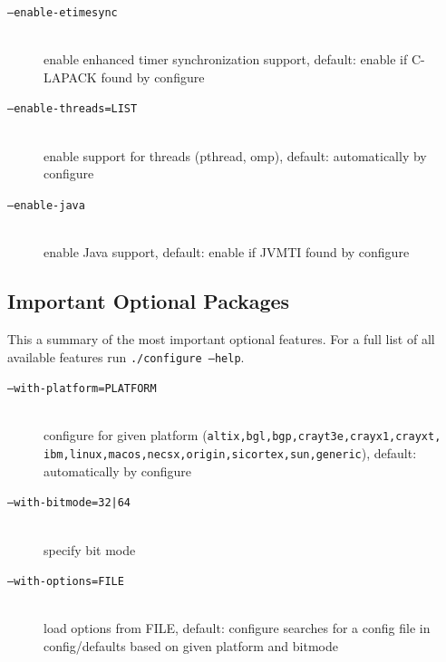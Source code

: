 \documentclass[a4paper,twoside,12pt,BCOR12mm]{scrbook}
\begin{document}
\begin{latexonly}
\begin{description}
\item[\texttt{--enable-etimesync}] ~\\
                              enable enhanced timer synchronization support,
                              default: enable if \latex{\\} C-LAPACK found by configure

\item[\texttt{--enable-threads=LIST}] ~\\
                              enable support for threads (pthread, omp), 
                              default: automatically by configure

\item[\texttt{--enable-java}] ~\\
                              enable Java support, default: enable if JVMTI
                              found by configure


\end{description}


\subsection*{Important Optional Packages}

      This a summary of the most important optional features. For a full list of all available 
      features run \texttt{./configure --help}.

\begin{description}
\item[\texttt{--with-platform=PLATFORM}] ~\\
                              configure for given platform
                              (\texttt{altix,bgl,bgp,crayt3e,crayx1,crayxt,\\
                              ibm,linux,macos,necsx,origin,sicortex,sun,generic}),
                              default: automatically by configure

\item[\texttt{--with-bitmode=32|64}] ~\\
                              specify bit mode

\item[\texttt{--with-options=FILE}] ~\\
                              load options from FILE, default: configure
                              searches for a config file in config/defaults
                              based on given platform and bitmode


\end{description}
\end{latexonly}
\end{document}
